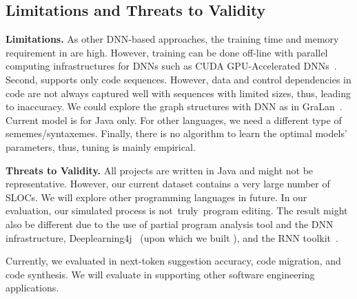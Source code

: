 \subsection{Limitations and Threats to Validity}

\noindent
{\bf Limitations.} As other DNN-based approaches, the training time
and memory requirement in {\tool} are high.
However, training can be done off-line with
parallel computing infrastructures for DNNs such as CUDA
GPU-Accelerated DNNs~\cite{cuda-dnn}. Second, {\tool} supports only
code sequences. However, data and control dependencies in code are not
always captured well with sequences with limited sizes, thus, leading
to inaccuracy. We could explore the graph structures with DNN as in
GraLan~\cite{icse15}. 
Current model is for Java only. For other languages, we need a
different type of sememes/syntaxemes. Finally, there is no algorithm
to learn the optimal models' parameters, thus, tuning is mainly
empirical.

\vspace{0.03in}
\noindent
{\bf Threats to Validity.} All projects are written in Java and might
not be representative. However, our current dataset contains a very
large number of SLOCs. We will explore other programming languages in
future. In our evaluation, our simulated process is not~truly~program
editing.  The result might also be different due to the use of partial
program analysis tool and the DNN infrastructure,
Deeplearning4j~\cite{Deeplearning4j} (upon which we built {\tool}),
and the RNN toolkit~\cite{rnntool}.

Currently, we evaluated {\tool} in next-token suggestion accuracy,
code migration, and code synthesis. We will evaluate {\tool} in supporting other software engineering
applications.




